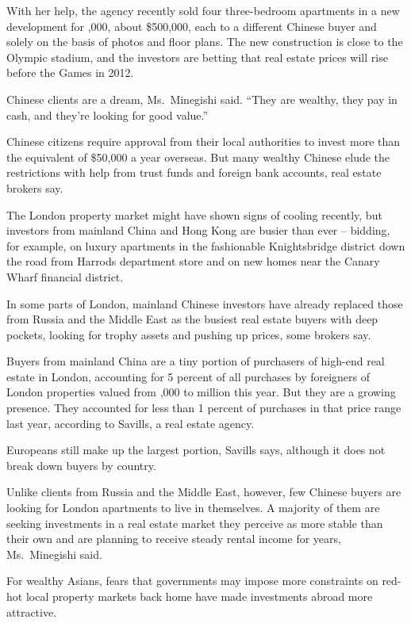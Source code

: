 ﻿\documentclass[12pt]{article}
\begin{document}
With her help, the agency recently sold four three-bedroom apartments in a new development for
,000, about \$500,000, each to a different Chinese buyer and solely on the basis of
photos and floor plans. The new construction is close to the Olympic stadium, and the investors are
betting that real estate prices will rise before the Games in 2012.

Chinese clients are a dream, Ms.~Minegishi said. ``They are wealthy, they pay in cash, and they're
looking for good value.''

Chinese citizens require approval from their local authorities to invest more than the equivalent of
\$50,000 a year overseas. But many wealthy Chinese elude the restrictions with help from trust funds
and foreign bank accounts, real estate brokers say.

The London property market might have shown signs of cooling recently, but investors from mainland
China and Hong Kong are busier than ever -- bidding, for example, on luxury apartments in the
fashionable Knightsbridge district down the road from Harrods department store and on new homes near
the Canary Wharf financial district.

In some parts of London, mainland Chinese investors have already replaced those from Russia and the
Middle East as the busiest real estate buyers with deep pockets, looking for trophy assets and
pushing up prices, some brokers say.

Buyers from mainland China are a tiny portion of purchasers of high-end real estate in London,
accounting for 5 percent of all purchases by foreigners of London properties valued from
,000 to  million this year. But they are a growing presence. They
accounted for less than 1 percent of purchases in that price range last year, according to Savills,
a real estate agency.

Europeans still make up the largest portion, Savills says, although it does not break down buyers by
country.

Unlike clients from Russia and the Middle East, however, few Chinese buyers are looking for London
apartments to live in themselves. A majority of them are seeking investments in a real estate market
they perceive as more stable than their own and are planning to receive steady rental income for
years, Ms.~Minegishi said.

For wealthy Asians, fears that governments may impose more constraints on red-hot local property
markets back home have made investments abroad more attractive.
\end{document}
